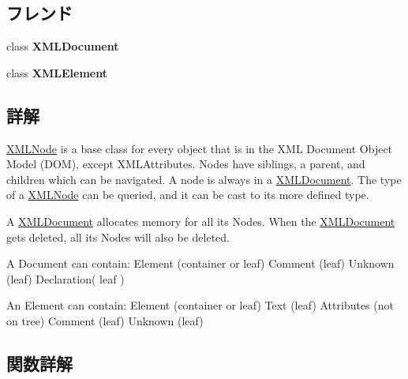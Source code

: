 \subsection*{フレンド}
\begin{DoxyCompactItemize}
\item 
\mbox{\label{classtinyxml2_1_1_x_m_l_node_a4eee3bda60c60a30e4e8cd4ea91c4c6e}} 
class {\bfseries X\+M\+L\+Document}
\item 
\mbox{\label{classtinyxml2_1_1_x_m_l_node_ac2fba9b6e452829dd892f7392c24e0eb}} 
class {\bfseries X\+M\+L\+Element}
\end{DoxyCompactItemize}


\subsection{詳解}
\hyperlink{classtinyxml2_1_1_x_m_l_node}{X\+M\+L\+Node} is a base class for every object that is in the X\+ML Document Object Model (D\+OM), except X\+M\+L\+Attributes. Nodes have siblings, a parent, and children which can be navigated. A node is always in a \hyperlink{classtinyxml2_1_1_x_m_l_document}{X\+M\+L\+Document}. The type of a \hyperlink{classtinyxml2_1_1_x_m_l_node}{X\+M\+L\+Node} can be queried, and it can be cast to its more defined type.

A \hyperlink{classtinyxml2_1_1_x_m_l_document}{X\+M\+L\+Document} allocates memory for all its Nodes. When the \hyperlink{classtinyxml2_1_1_x_m_l_document}{X\+M\+L\+Document} gets deleted, all its Nodes will also be deleted.

\begin{DoxyVerb}A Document can contain: Element (container or leaf)
                        Comment (leaf)
                        Unknown (leaf)
                        Declaration( leaf )

An Element can contain: Element (container or leaf)
                        Text    (leaf)
                        Attributes (not on tree)
                        Comment (leaf)
                        Unknown (leaf)\end{DoxyVerb}
 

\subsection{関数詳解}
\mbox{\label{classtinyxml2_1_1_x_m_l_node_a81e66df0a44c67a7af17f3b77a152785}} 
